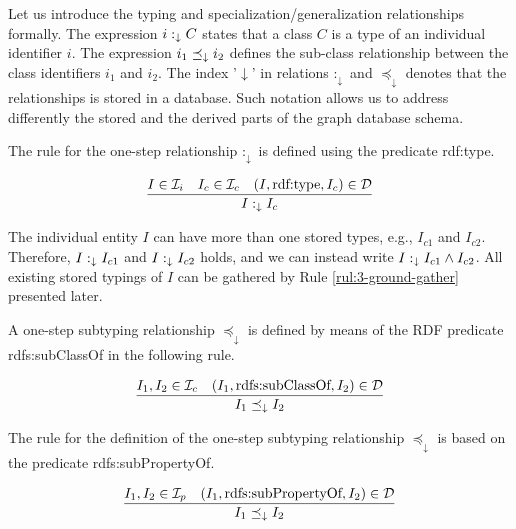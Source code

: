 \documentclass[runningheads]{llncs}
\newcommand{\darr}{\downarrow}
\newcommand{\D}{{\cal D}}
\newcommand{\Ii}{{\cal I}_i}
\newcommand{\Ic}{{\cal I}_c}
\newcommand{\Ip}{{\cal I}_p}
\newcommand{\memo}[1]{}
\newcommand{\notes}[1]{\noindent\begin{small}-- \emph{#1}\\\end{small}}
\begin{document}
Let us introduce the typing and specialization/generalization
relationships formally. The expression $i:_\darr\/C$ states that a
class $C$ is a type of an individual identifier $i$. The expression
$i_1\preceq_\darr\/i_2$ defines the sub-class relationship between the
class identifiers $i_1$ and $i_2$. The index '$\darr$' in relations
$:_\darr$ and $\preceq_\darr$ denotes that the relationships is stored
in a database. Such notation allows us to address differently the
stored and the derived parts of the graph database schema.


\memo{Oportunity to introduce ``mixed'' objects including ground and schema components.}

The rule for the one-step relationship $:_\darr$ is defined using the
predicate rdf:type.

\begin{equation}
\dfrac{I\in\Ii\quad I_c\in\Ic\quad (I,\text{rdf:type},I_c)\in \D}
      {I :_\darr I_c}
\end{equation}

The individual entity $I$ can have more than one stored types, e.g.,
$I_{c1}$ and $I_{c2}$. Therefore, $I:_\darr\/I_{c1}$ and
$I:_\darr\/I_{c2}$ holds, and we can instead write
$I:_\darr\/I_{c1}\land\/I_{c2}$. All existing stored typings of $I$
can be gathered by Rule \ref{rul:3-ground-gather} presented later.

A one-step subtyping relationship $\preceq_\darr$ is defined by means
of the RDF predicate rdfs:sub\-ClassOf in the following rule.

\begin{equation}
\dfrac{I_1,I_2\in\Ic \quad (I_1,\text{rdfs:subClassOf},I_2)\in \D}
{I_1 \preceq_\darr\/I_2}
\end{equation}

The rule for the definition of the one-step subtyping relationship
$\preceq_\darr$ is based on the predicate rdfs:subPropertyOf.

\begin{equation}
\dfrac{I_1,I_2\in\Ip \quad (I_1,\text{rdfs:subPropertyOf},I_2)\in \D}
      {I_1\preceq_\darr\/I_2}
\end{equation}
\end{document}
